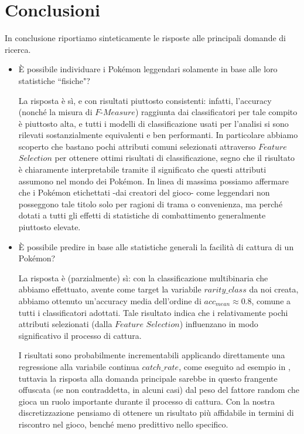 \documentclass[fleqn,10pt]{SelfArx} %
\begin{document}
\section{Conclusioni}
In conclusione riportiamo sinteticamente le risposte alle principali domande di ricerca.
\begin{itemize}
\item \`E possibile individuare i Pokémon leggendari solamente in base alle loro statistiche ``fisiche"? 

La risposta è sì, e con risultati piuttosto consistenti: infatti, l'accuracy (nonché la misura di $F$-$Measure$) raggiunta dai classificatori per tale compito è piuttosto alta, e tutti i modelli di classificazione usati per l'analisi si sono rilevati sostanzialmente equivalenti e ben performanti.
In particolare abbiamo scoperto che bastano pochi attributi comuni selezionati attraverso $Feature$ $Selection$ per ottenere ottimi risultati di classificazione, segno che il risultato è chiaramente interpretabile tramite il significato che questi attributi assumono nel mondo dei Pokémon.
In linea di massima possiamo affermare che i Pokémon etichettati -dai creatori del gioco- come leggendari non posseggono tale titolo solo per ragioni di trama o convenienza, ma perché dotati a tutti gli effetti di statistiche di combattimento generalmente piuttosto elevate.

\item \`E possibile predire in base alle statistiche generali la facilità di cattura di un Pokémon?

La risposta è (parzialmente) sì: con la classificazione multibinaria che abbiamo effettuato, avente come target la variabile $rarity\_class$ da noi creata, abbiamo ottenuto un'accuracy media dell'ordine di $acc_{mean}\approx 0.8$, comune a tutti i classificatori adottati. Tale risultato indica che i relativamente pochi attributi selezionati (dalla $Feature$ $Selection$) influenzano in modo significativo il processo di cattura.

I risultati sono probabilmente incrementabili applicando direttamente una regressione alla variabile continua $catch\_rate$, come eseguito ad esempio in \cite{report}, tuttavia la risposta alla domanda principale sarebbe in questo frangente offuscata (se non contraddetta, in alcuni casi) dal peso del fattore random che gioca un ruolo importante durante il processo di cattura. Con la nostra discretizzazione pensiamo di ottenere un risultato più affidabile in termini di riscontro nel gioco, benché meno predittivo nello specifico.


\end{itemize}
\end{document}
